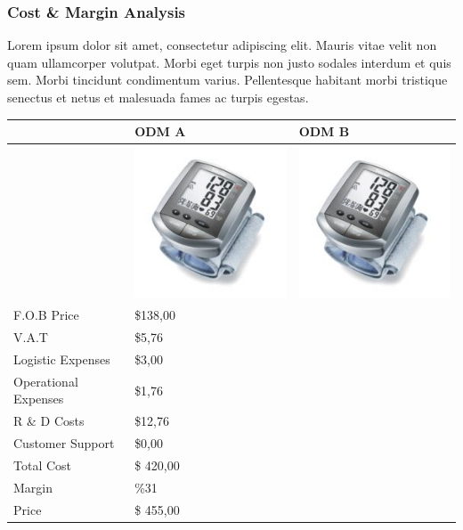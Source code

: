 \documentclass[11pt,a4paper,titlepage]{article}
\begin{document}
\subsubsection{Cost \& Margin Analysis}
Lorem ipsum dolor sit amet, consectetur adipiscing elit. Mauris vitae velit 
non quam ullamcorper volutpat. Morbi eget turpis non justo sodales interdum 
et quis sem. Morbi tincidunt condimentum varius. Pellentesque habitant morbi 
tristique senectus et netus et malesuada fames ac turpis egestas.\newline
\begin{tabular}{ | l | l | l | }\hline
  & ODM A & ODM B\\\hline
  & \includegraphics[scale=0.40,bb=0 0 150 150]{prod_bpm4.jpg} & 
  \includegraphics[scale=0.40,bb=0 0 150 150]{prod_bpm4.jpg} \\\hline
  F.O.B Price & \$138,00 &\\\hline
  V.A.T & \$5,76 &\\\hline
  Logistic Expenses & \$3,00 &\\\hline
  Operational Expenses & \$1,76 &\\\hline
  R \& D Costs & \$12,76 &\\\hline
  Customer Support & \$0,00 &\\\hline
  Total Cost & \$ 420,00 &\\\hline
  Margin & \%31 &\\\hline
  Price & \$ 455,00 &\\\hline
\end{tabular}
\pagebreak
\end{document}
